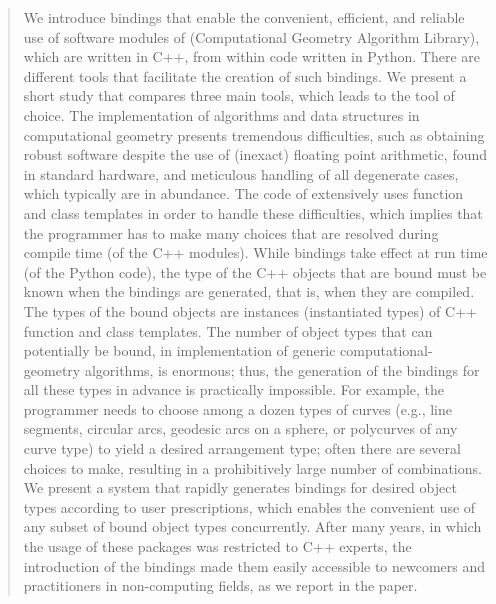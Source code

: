 \begin{abstract}
We introduce bindings that enable the convenient, efficient, and
reliable use of software modules of \cgal{} (Computational Geometry
Algorithm Library), which are written in C++, from within code written
in Python. There are different tools that facilitate the creation of
such bindings. We present a short study that compares three main
tools, which leads to the tool of choice. The implementation of
algorithms and data structures in computational geometry presents
tremendous difficulties, such as obtaining robust software despite the
use of (inexact) floating point arithmetic, found in standard
hardware, and meticulous handling of all degenerate cases, which
typically are in abundance. The code of \cgal{} extensively uses
function and class templates in order to handle these difficulties,
which implies that the programmer has to make many choices that are
resolved during compile time (of the C++ modules). While bindings
take effect at run time (of the Python code), the type of the C++
objects that are bound must be known when the bindings are generated,
that is, when they are compiled. The types of the bound objects are
instances (instantiated types) of C++ function and class
templates. The number of object types that can potentially be bound,
in implementation of generic computational-geometry algorithms, is
enormous; thus, the generation of the bindings for all these types in
advance is practically impossible. For example, the programmer needs
to choose among a dozen types of curves (e.g., line segments, circular
arcs, geodesic arcs on a sphere, or polycurves of any curve type) to
yield a desired arrangement type; often there are several choices to
make, resulting in a prohibitively large number of combinations. We
present a system that rapidly generates bindings for desired
object types according to user prescriptions, which enables the
convenient use of any subset of bound object types concurrently. After
many years, in which the usage of these packages was restricted to C++
experts, the introduction of the bindings made them easily accessible
to newcomers and practitioners in non-computing fields, as we report
in the paper.
\end{abstract}

